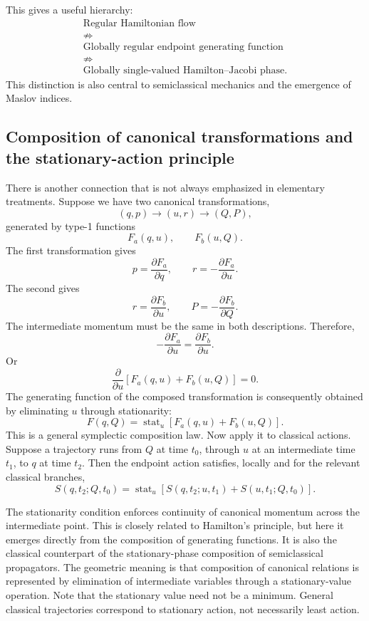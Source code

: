 This gives a useful hierarchy:
\[
\boxed{
\begin{gathered}
\text{Regular Hamiltonian flow}\\
\not\Rightarrow\\
\text{Globally regular endpoint generating function}\\
\not\Rightarrow\\
\text{Globally single-valued Hamilton--Jacobi phase}.
\end{gathered}
}
\]
This distinction is also central to semiclassical mechanics and the emergence
of Maslov indices.

\subsection{ Composition of canonical transformations and the stationary-action
principle}
There is another connection that is not always emphasized in elementary
treatments.
Suppose we have two canonical transformations,
\[
(q,p)\longrightarrow(u,r)
\longrightarrow(Q,P),
\]
generated by type-1 functions
\[
F_a(q,u),\qquad F_b(u,Q).
\]
The first transformation gives
\[
p=\frac{\partial F_a}{\partial q},
\qquad
r=-\frac{\partial F_a}{\partial u}.
\]
The second gives
\[
r=\frac{\partial F_b}{\partial u},
\qquad
P=-\frac{\partial F_b}{\partial Q}.
\]
The intermediate momentum must be the same in both descriptions.
Therefore,
\[
-\frac{\partial F_a}{\partial u}
=
\frac{\partial F_b}{\partial u}.
\]
Or
\[
\boxed{
\frac{\partial}{\partial u}
\left[F_a(q,u)+F_b(u,Q)\right]=0.
}
\]
The generating function of the composed transformation is consequently obtained
by eliminating \(u\) through stationarity:
\[
\boxed{
F(q,Q)=
\operatorname{stat}_{u}
\left[F_a(q,u)+F_b(u,Q)\right].
}
\]
This is a general symplectic composition law.
Now apply it to classical actions.
Suppose a trajectory runs from \(Q\) at time \(t_0\), through \(u\) at an
intermediate time \(t_1\), to \(q\) at time \(t_2\).
Then the endpoint action satisfies, locally and for the relevant classical branches,
\[
\boxed{
S(q,t_2;Q,t_0)
=
\operatorname{stat}_{u}
\left[
S(q,t_2;u,t_1)
+
S(u,t_1;Q,t_0)
\right].
}
\]

The stationarity condition enforces continuity of canonical momentum across the
intermediate point. This is closely related to Hamilton's principle, but here
it emerges directly from the composition of generating functions. It is also
the classical counterpart of the stationary-phase composition of semiclassical
propagators. The geometric meaning is that composition of canonical relations
is represented by elimination of intermediate variables through a
stationary-value operation. Note that the stationary value need not be a
minimum. General classical trajectories correspond to stationary action, not
necessarily least action.

